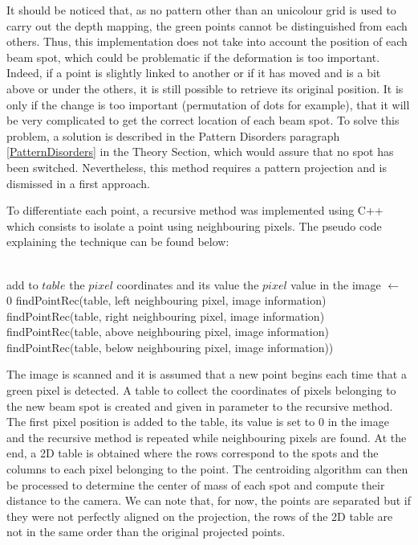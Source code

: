 It should be noticed that, as no pattern other than an unicolour grid is used to carry out the depth mapping, the green points cannot be distinguished from each others. Thus, this implementation does not take into account the position of each beam spot, which could be problematic if the deformation is too important. Indeed, if a point is slightly linked to another or if it has moved and is a bit above or under the others, it is still possible to retrieve its original position. It is only if the change is too important (permutation of dots for example), that it will be very complicated to get the correct location of each beam spot. To solve this problem, a solution is described in the Pattern Disorders paragraph \ref{PatternDisorders} in the Theory Section, which would assure that no spot has been switched. Nevertheless, this method requires a pattern projection and is dismissed in a first approach. 

To differentiate each point, a recursive method was implemented using C++ which consists to isolate a point using neighbouring pixels. The pseudo code explaining the technique can be found below:

\begin{algorithmic}
\\
    			\State add to $table$ the $pixel$ coordinates and its value
    			\State the $pixel$ value in the image $\gets$ 0
			\State findPointRec(table, left neighbouring pixel, image information)
			\State findPointRec(table, right neighbouring pixel, image information)
			\State findPointRec(table, above neighbouring pixel, image information)
			\State findPointRec(table, below neighbouring pixel, image information))
		\EndIf
\EndFunction
\end{algorithmic}

The image is scanned and it is assumed that a new point begins each time that a green pixel is detected. A table to collect the coordinates of pixels belonging to the new beam spot is created and given in parameter to the recursive method. The first pixel position is added to the table, its value is set to 0 in the image and the recursive method is repeated while neighbouring pixels are found. At the end, a 2D table is obtained where the rows correspond to the spots and the columns to each pixel belonging to the point. The centroiding algorithm can then be processed to determine the center of mass of each spot and compute their distance to the camera. We can note that, for now, the points are separated but if they were not perfectly aligned on the projection, the rows of the 2D table are not in the same order than the original projected points.